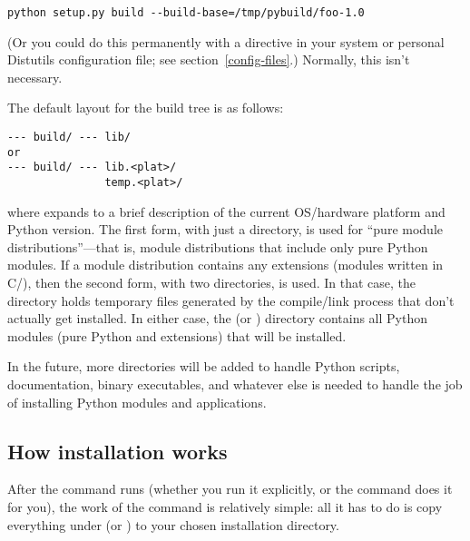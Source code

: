 \documentclass{howto}
\begin{document}
\begin{verbatim}
python setup.py build --build-base=/tmp/pybuild/foo-1.0
\end{verbatim}

(Or you could do this permanently with a directive in your system or
personal Distutils configuration file; see
section~\ref{config-files}.)  Normally, this isn't necessary.

The default layout for the build tree is as follows:

\begin{verbatim}
--- build/ --- lib/
or
--- build/ --- lib.<plat>/
               temp.<plat>/
\end{verbatim}

where  expands to a brief description of the current
OS/hardware platform and Python version.  The first form, with just a
 directory, is used for ``pure module distributions''---that
is, module distributions that include only pure Python modules.  If a
module distribution contains any extensions (modules written in C/\Cpp),
then the second form, with two  directories, is used.  In
that case, the  directory holds temporary
files generated by the compile/link process that don't actually get
installed.  In either case, the  (or
) directory contains all Python modules (pure
Python and extensions) that will be installed.

In the future, more directories will be added to handle Python scripts,
documentation, binary executables, and whatever else is needed to handle
the job of installing Python modules and applications.


\subsection{How installation works}
\label{how-install-works}

After the  command runs (whether you run it explicitly,
or the  command does it for you), the work of the
 command is relatively simple: all it has to do is copy
everything under  (or )
to your chosen installation directory.
\end{document}
